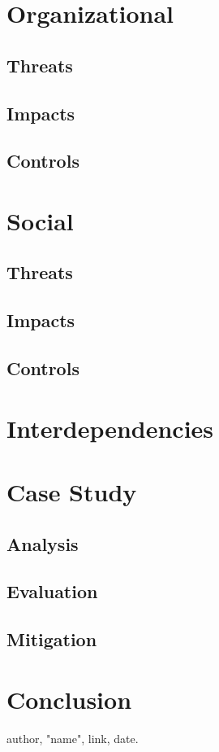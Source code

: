 \documentclass[11pt,a4paper,draft]{article}
\begin{document}
\section{Organizational}

\subsection{Threats}

\subsection{Impacts}

\subsection{Controls}

\section{Social}

\subsection{Threats}

\subsection{Impacts}

\subsection{Controls}

\section{Interdependencies}

\section{Case Study}

\subsection{Analysis}

\subsection{Evaluation}

\subsection{Mitigation}

\section{Conclusion}

\cite{item}

\begin{thebibliography}{9}

author,
"name",
link,
date.

\end{thebibliography}
\end{document}

